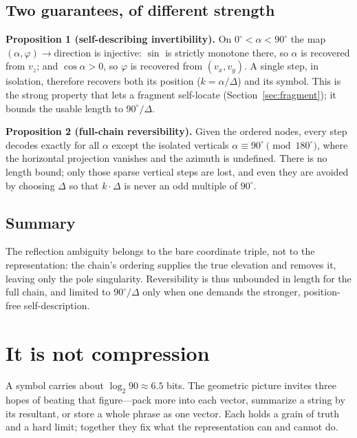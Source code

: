 \documentclass[11pt]{article}
\renewcommand{\deg}{^{\circ}}  %
\begin{document}
\subsection{Two guarantees, of different strength}

\noindent\textbf{Proposition 1 (self-describing invertibility).} On $0\deg<\alpha<90\deg$ the
map $(\alpha,\varphi)\to\text{direction}$ is injective: $\sin$ is strictly monotone there, so
$\alpha$ is recovered from $v_z$; and $\cos\alpha>0$, so $\varphi$ is recovered from
$(v_x,v_y)$. A single step, in isolation, therefore recovers both its position
($k=\alpha/\Delta$) and its symbol. This is the strong property that lets a fragment
self-locate (Section~\ref{sec:fragment}); it bounds the usable length to $90\deg/\Delta$.

\medskip
\noindent\textbf{Proposition 2 (full-chain reversibility).} Given the ordered nodes, every
step decodes exactly for all $\alpha$ except the isolated verticals $\alpha\equiv 90\deg
\pmod{180\deg}$, where the horizontal projection vanishes and the azimuth is undefined. There
is no length bound; only those sparse vertical steps are lost, and even they are avoided by
choosing $\Delta$ so that $k\cdot\Delta$ is never an odd multiple of $90\deg$.

\subsection{Summary}

The reflection ambiguity belongs to the bare coordinate triple, not to the representation:
the chain's ordering supplies the true elevation and removes it, leaving only the pole
singularity. Reversibility is thus unbounded in length for the full chain, and limited to
$90\deg/\Delta$ only when one demands the stronger, position-free self-description.

\section{It is not compression}\label{sec:compression}

A symbol carries about $\log_2 90\approx 6.5$ bits. The geometric picture invites three hopes
of beating that figure---pack more into each vector, summarize a string by its resultant, or
store a whole phrase as one vector. Each holds a grain of truth and a hard limit; together
they fix what the representation can and cannot do.
\end{document}

